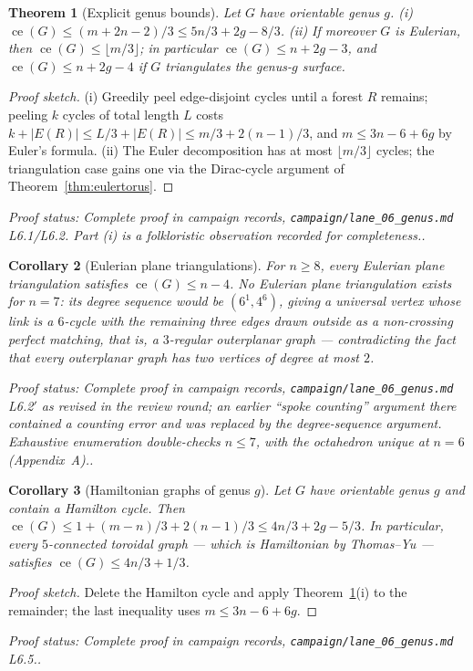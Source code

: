 \documentclass[a4paper,11pt]{amsart}
\newtheorem{theorem}{Theorem}[section]
\newtheorem{corollary}[theorem]{Corollary}
\theoremstyle{definition}
\theoremstyle{remark}
\newcommand{\ce}{\operatorname{ce}}
\newcommand{\proofsrc}[1]{\par\smallskip\noindent\begin{sloppypar}\small\emph{Proof status: #1.}\end{sloppypar}\par\smallskip}
\begin{document}
\begin{theorem}[Explicit genus bounds]\label{thm:genus}
Let $G$ have orientable genus $g$.
(i) $\ce(G)\le (m+2n-2)/3\le 5n/3+2g-8/3$.
(ii) If moreover $G$ is Eulerian, then $\ce(G)\le\lfloor m/3\rfloor$; in particular $\ce(G)\le n+2g-3$,
and $\ce(G)\le n+2g-4$ if $G$ triangulates the genus-$g$ surface.
\end{theorem}
\begin{proof}[Proof sketch]
(i) Greedily peel edge-disjoint cycles until a forest $R$ remains; peeling $k$ cycles of total length $L$
costs $k+|E(R)|\le L/3+|E(R)|\le m/3+2(n-1)/3$, and $m\le 3n-6+6g$ by Euler's formula. (ii) The Euler
decomposition has at most $\lfloor m/3\rfloor$ cycles; the triangulation case gains one via the Dirac-cycle
argument of Theorem~\ref{thm:eulertorus}.
\end{proof}
\proofsrc{Complete proof in campaign records, \texttt{campaign/lane\_06\_genus.md} L6.1/L6.2. Part (i) is
a folkloristic observation recorded for completeness.}

\begin{corollary}[Eulerian plane triangulations]\label{cor:eulertripy}
For $n\ge8$, every Eulerian plane triangulation satisfies $\ce(G)\le n-4$. No Eulerian plane triangulation
exists for $n=7$: its degree sequence would be $(6^1,4^6)$, giving a universal vertex whose link is a
$6$-cycle with the remaining three edges drawn outside as a non-crossing perfect matching, that is, a
$3$-regular outerplanar graph --- contradicting the fact that every outerplanar graph has two vertices of
degree at most $2$.
\end{corollary}
\proofsrc{Complete proof in campaign records, \texttt{campaign/lane\_06\_genus.md} L6.2$'$ as revised in
the review round; an earlier ``spoke counting'' argument there contained a counting error and was replaced
by the degree-sequence argument. Exhaustive enumeration double-checks $n\le7$, with the octahedron unique
at $n=6$ (Appendix~A).}

\begin{corollary}[Hamiltonian graphs of genus $g$]\label{cor:hamilton}
Let $G$ have orientable genus $g$ and contain a Hamilton cycle. Then
$\ce(G)\le 1+(m-n)/3+2(n-1)/3\le 4n/3+2g-5/3$. In particular, every $5$-connected toroidal graph --- which
is Hamiltonian by Thomas--Yu \cite{TY97} --- satisfies $\ce(G)\le 4n/3+1/3$.
\end{corollary}
\begin{proof}[Proof sketch]
Delete the Hamilton cycle and apply Theorem~\ref{thm:genus}(i) to the remainder; the last inequality uses
$m\le 3n-6+6g$.
\end{proof}
\proofsrc{Complete proof in campaign records, \texttt{campaign/lane\_06\_genus.md} L6.5.}
\end{document}
